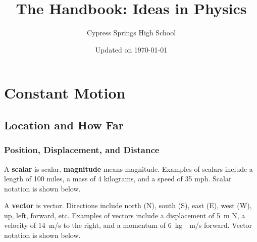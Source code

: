 \documentclass[dvipsnames]{article}
\title{The Handbook: Ideas in Physics}
\author{Cypress Springs High School}
\date{Updated on \today}
\newif\ifShowUnitI                               %
\begin{document}
\maketitle
\tableofcontents

\clearpage
\section{Constant Motion}

\ifShowUnitI

\subsection{Location and How Far}

\subsubsection{Position, Displacement, and Distance}

A \textbf{\gls{scalar}} is \glsdesc{scalar}. \textbf{\Gls{magnitude}} means \glsdesc{magnitude}. Examples of scalars include a length of 100 miles, a mass of 4 kilograms, and a speed of 35 mph. Scalar notation is shown below.

\begin{center}
\end{center}

A \textbf{\gls{vector}} is \glsdesc{vector}. Directions include north (N), south (S), east (E), west (W), up, left, forward, etc. Examples of vectors include a displacement of \SI{5}{m} N, a velocity of \SI{14}{m/s} to the right, and a momentum of \SI{6}{kg\cdot m/s} forward. Vector notation is shown below.

\begin{center}
\end{center}
\end{document}
